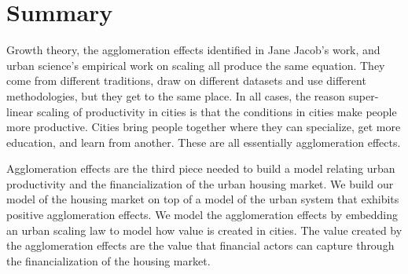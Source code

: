 \section{Summary}

Growth theory, the agglomeration effects identified in Jane Jacob's work, and urban science's empirical work on scaling all produce the same equation. They come from different traditions, draw on different datasets and use different methodologies, but they get to the same place. 
In all cases, the reason super-linear scaling of productivity in cities is that the conditions in cities make people more productive. %
Cities bring people together where they can specialize, get more education, and learn from another. These are all essentially agglomeration effects. 

Agglomeration effects are the third piece needed to build a model relating urban productivity and the financialization of the urban housing market. %
We build our model of the housing market on top of a model of the urban system that exhibits positive agglomeration effects. 
We model the agglomeration effects by embedding an urban \gls{scaling law} to model how value is created in cities. %
The value created by the agglomeration effects are the value that financial actors can capture through the financialization of the housing market.
